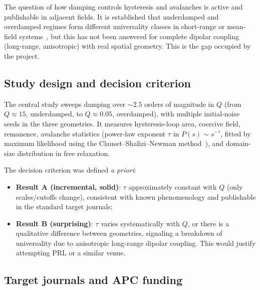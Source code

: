 \documentclass[11pt,a4paper]{article}
\begin{document}
The question of how damping controls hysteresis and avalanches is active and publishable in adjacent fields. It is established that underdamped and overdamped regimes form different universality classes in short-range or mean-field systems~\cite{dahmen2011}, but this has not been answered for complete dipolar coupling (long-range, anisotropic) with real spatial geometry. This is the gap occupied by the project.

\subsection{Study design and decision criterion}

The central study sweeps damping over $\sim 2.5$ orders of magnitude in $Q$ (from $Q \approx 15$, underdamped, to $Q \approx 0.05$, overdamped), with multiple initial-noise seeds in the three geometries. It measures hysteresis-loop area, coercive field, remanence, avalanche statistics (power-law exponent $\tau$ in $P(s) \sim s^{-\tau}$, fitted by maximum likelihood using the Clauset--Shalizi--Newman method~\cite{clauset2009}), and domain-size distribution in free relaxation.

The decision criterion was defined \emph{a priori}:
\begin{itemize}
\item \textbf{Result A (incremental, solid)}: $\tau$ approximately constant with $Q$ (only scales/cutoffs change), consistent with known phenomenology and publishable in the standard target journals;
\item \textbf{Result B (surprising)}: $\tau$ varies systematically with $Q$, or there is a qualitative difference between geometries, signaling a breakdown of universality due to anisotropic long-range dipolar coupling. This would justify attempting PRL or a similar venue.
\end{itemize}

\subsection{Target journals and APC funding}
\end{document}

